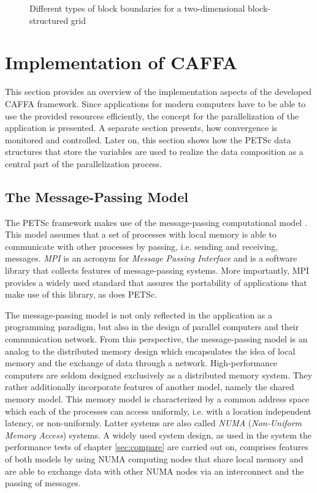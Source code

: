 \begin{figure}[h!]
  \centering
  
  \caption{Different types of block boundaries for a two-dimensional block-structured grid}
  \label{fig:matching}
\end{figure}

\section{Implementation of CAFFA}
\label{sec:caffaimpl}

This section provides an overview of the implementation aspects of the developed CAFFA framework. Since applications for modern computers have to be able to use the provided resources efficiently, the concept for the parallelization of the application is presented. A separate section presents, how convergence is monitored and controlled. Later on, this section shows how the PETSc data structures that store the variables are used to realize the data composition as a central part of the parallelization process.

\subsection{The Message-Passing Model}

The PETSc framework makes use of the message-passing computational model \cite{gropp99}. This model assumes that a set of processes with local memory is able to communicate with other processes by passing, i.e. sending and receiving, messages. \emph{MPI} is an acronym for \emph{Message Passing Interface} and is a software library that collects features of message-passing systems. More importantly, MPI provides a widely used standard that assures the portability of applications that make use of this library, as does PETSc. 

The message-passing model is not only reflected in the application as a programming paradigm, but also in the design of parallel computers and their communication network. From this perspective, the message-passing model is an analog to the distributed memory design which encapsulates the idea of local memory and the exchange of data through a network. High-performance computers are seldom designed exclusively as a distributed memory system. They rather additionally incorporate features of another model, namely the shared memory model. This memory model is characterized by a common address space which each of the processes can access uniformly, i.e. with a location independent latency, or non-uniformly. Latter systems are also called \emph{NUMA} (\emph{Non-Uniform Memory Access}) systems. A widely used system design, as used in the system the performance tests of chapter \ref{sec:compare} are carried out on, comprises features of both models by using NUMA computing nodes that share local memory and are able to exchange data with other NUMA nodes via an interconnect and the passing of messages.

